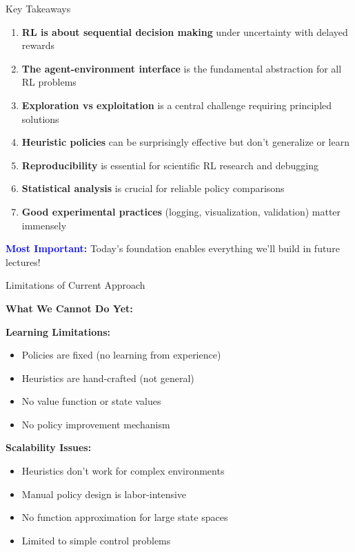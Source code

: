 \documentclass[aspectratio=169,10pt]{beamer}
\begin{document}
\begin{frame}{Key Takeaways}

\begin{enumerate}
    \item \textbf{RL is about sequential decision making} under uncertainty with delayed rewards

    \item \textbf{The agent-environment interface} is the fundamental abstraction for all RL problems

    \item \textbf{Exploration vs exploitation} is a central challenge requiring principled solutions

    \item \textbf{Heuristic policies} can be surprisingly effective but don't generalize or learn

    \item \textbf{Reproducibility} is essential for scientific RL research and debugging

    \item \textbf{Statistical analysis} is crucial for reliable policy comparisons

    \item \textbf{Good experimental practices} (logging, visualization, validation) matter immensely
\end{enumerate}

\vfill

\textcolor{blue}{\textbf{Most Important:}} Today's foundation enables everything we'll build in future lectures!

\end{frame}

\begin{frame}{Limitations of Current Approach}

\textbf{What We Cannot Do Yet:}

\vfill

\textbf{Learning Limitations:}
\begin{itemize}
    \item Policies are fixed (no learning from experience)
    \item Heuristics are hand-crafted (not general)
    \item No value function or state values
    \item No policy improvement mechanism
\end{itemize}

\vfill

\textbf{Scalability Issues:}
\begin{itemize}
    \item Heuristics don't work for complex environments
    \item Manual policy design is labor-intensive
    \item No function approximation for large state spaces
    \item Limited to simple control problems
\end{itemize}

\end{frame}
\end{document}
